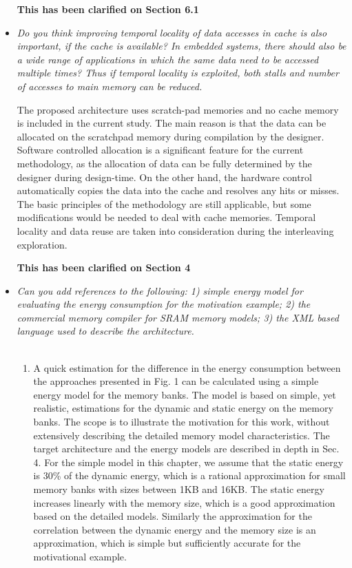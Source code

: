\documentclass[12pt,a4paper,notitlepage]{article}
\begin{document}
\begin{itemize}
\textbf{This has been clarified on Section 6.1}

\item \textit{Do you think improving temporal locality of data accesses in cache is also important, if the cache is available? In embedded systems, there should also be a wide range of applications in which the same data need to be accessed multiple times? Thus if temporal locality is exploited, both stalls and number of accesses to main memory can be reduced.}

The proposed architecture uses scratch-pad memories and no cache memory is included in the current study.
The main reason is that the data can be allocated on the scratchpad memory during compilation by the designer.
Software controlled allocation is a significant feature for the current methodology, as the allocation of data can be fully determined by the designer during design-time.
On the other hand, the hardware control automatically copies the data into the cache and resolves any hits or misses.
The basic principles of the methodology are still applicable, but some modifications would be needed to deal with cache memories.
Temporal locality and data reuse are taken into consideration during the interleaving exploration.

\textbf{This has been clarified on Section 4}

\item \textit{Can you add references to the following: 1) simple energy model for evaluating the energy consumption for the motivation example; 2) the commercial memory compiler for SRAM memory models; 3) the XML based language used to describe the architecture.}
\\
\\
\begin{enumerate}
\item A quick estimation for the difference in the energy consumption between the approaches presented in Fig. 1 can be calculated using a simple energy model for the memory banks. 
The model is based on simple, yet realistic, estimations for the dynamic and static energy on the memory banks.
The scope is to illustrate the motivation for this work, without extensively describing the detailed memory model characteristics. 
The target architecture and the energy models are described in depth in Sec. 4. 
For the simple model in this chapter, we assume that the static energy is 30\% of the dynamic energy, which is a rational approximation for small memory banks with sizes between 1KB and 16KB.
The static energy increases linearly with the memory size, which is a good approximation based on the detailed models.
Similarly the approximation for the correlation between the dynamic energy and the memory size is an approximation, which is simple but sufficiently accurate for the motivational example.


\end{enumerate}
\end{itemize}
\end{document}
